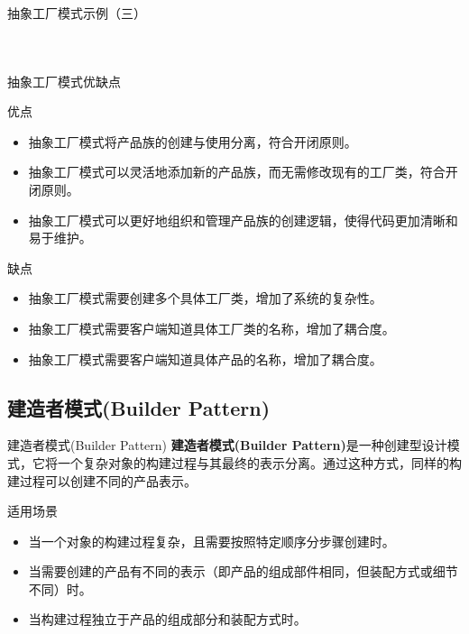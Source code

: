 \documentclass[UTF8,aspectratio=169]{beamer}
\begin{document}
\begin{frame}{抽象工厂模式示例（三）}
    \begin{columns}
        \begin{column}{0.48\textwidth}
            \inputminted[firstline=83, lastline=102]{cpp}{code/abstract_factory_pattern.cpp}
        \end{column}
        \begin{column}{0.48\textwidth}
            \inputminted[firstline=104, lastline=124]{cpp}{code/abstract_factory_pattern.cpp}
        \end{column}
    \end{columns}
\end{frame}

\begin{frame}{抽象工厂模式优缺点}
    \begin{ytublock}{优点}
        \begin{itemize}
            \item 抽象工厂模式将产品族的创建与使用分离，符合开闭原则。
            \item 抽象工厂模式可以灵活地添加新的产品族，而无需修改现有的工厂类，符合开闭原则。
            \item 抽象工厂模式可以更好地组织和管理产品族的创建逻辑，使得代码更加清晰和易于维护。
        \end{itemize}
    \end{ytublock}
    \begin{alertytublock}{缺点}
        \begin{itemize}
            \item 抽象工厂模式需要创建多个具体工厂类，增加了系统的复杂性。
            \item 抽象工厂模式需要客户端知道具体工厂类的名称，增加了耦合度。
            \item 抽象工厂模式需要客户端知道具体产品的名称，增加了耦合度。
        \end{itemize}
    \end{alertytublock}
\end{frame}

\subsection{建造者模式(Builder Pattern)}

\begin{frame}{建造者模式(Builder Pattern)}
    \textbf{建造者模式(Builder Pattern)}是一种创建型设计模式，它将一个复杂对象的构建过程与其最终的表示分离。通过这种方式，同样的构建过程可以创建不同的产品表示。
    \begin{ytublock}{适用场景}
        \begin{itemize}
            \item 当一个对象的构建过程复杂，且需要按照特定顺序分步骤创建时。
            \item 当需要创建的产品有不同的表示（即产品的组成部件相同，但装配方式或细节不同）时。
            \item 当构建过程独立于产品的组成部分和装配方式时。
        \end{itemize}
    \end{ytublock}
\end{frame}
\end{document}
